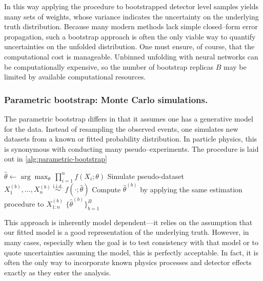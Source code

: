            In this way applying the procedure to bootstrapped detector level samples yields many sets of weights, whose variance indicates the uncertainty on the underlying truth distribution.
           Because many modern methods lack simple closed--form error propagation, such a bootstrap approach is often the only viable way to quantify uncertainties on the unfolded distribution.
           One must ensure, of course, that the computational cost is manageable.
           Unbinned unfolding with neural networks can be computationally expensive, so the number of bootstrap replicas $B$ may be limited by available computational resources.

        \subsubsection{Parametric bootstrap: Monte Carlo simulations.}
            The parametric bootstrap differs in that it assumes one has a generative model for the data.
            Instead of resampling the observed events, one simulates new datasets from a known or fitted probability distribution.
            In particle physics, this is synonymous with conducting many pseudo--experiments.
            The procedure is laid out in \cref{alg:parametric-bootstrap}
\begin{algorithm}
    \caption{Parametric bootstrap pseudo-experiments}
    \label{alg:parametric-bootstrap}
    \begin{algorithmic}
    \algospacing
    
    \State $\hat\theta \leftarrow \displaystyle\arg\max_{\theta}\,\prod_{i=1}^{n}f(X_{i};\theta)$
      \State Simulate pseudo-dataset $X_{1}^{(b)},\dots,X_{n}^{(b)}\;\overset{\text{i.i.d.}}{\sim}\;f(\cdot;\hat\theta)$
      \State Compute $\hat\theta^{(b)}$ by applying the same estimation procedure to $X_{1:n}^{(b)}$
    \EndFor
    \State \Return $\{\hat\theta^{(b)}\}_{b=1}^{B}$
    \end{algorithmic}
\end{algorithm}
            This approach is inherently model dependent---it relies on the assumption that our fitted model is a good representation of the underlying truth.
            However, in many cases, especially when the goal is to test consistency with that model or to quote uncertainties assuming the model, this is perfectly acceptable.
            In fact, it is often the only way to incorporate known physics processes and detector effects exactly as they enter the analysis.

